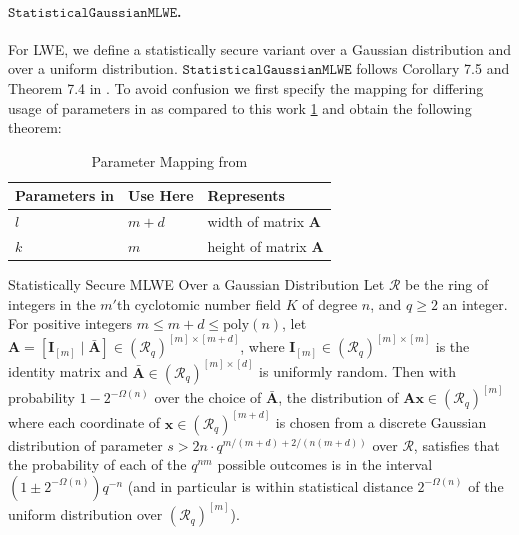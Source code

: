 \documentclass[
  a4paper,  %
  twoside,  %
  bibliography=totoc,
  headsepline,
  cleardoublepage=empty,
  parskip=half,
  draft=false
]{scrbook}
\begin{document}
\paragraph{$\texttt{StatisticalGaussianMLWE}$.} For LWE, we define a statistically secure variant over a Gaussian distribution and over a uniform distribution. $\texttt{StatisticalGaussianMLWE}$ follows Corollary 7.5 and Theorem 7.4 in \cite{LPR13}. To avoid confusion we first specify the mapping for differing usage of parameters in \cite{LPR13} as compared to this work \cref{tab:mapping-LPR13} and obtain the following theorem:

\begin{table}
  \centering
  \begin{tabular}[h]{lll}
    \toprule
    Parameters in \cite{LPR13} & Use Here & Represents                    \\\hline
    $l$                        & $m+d$    & width of matrix $\mathbf{A}$  \\
    $k$                        & $m$      & height of matrix $\mathbf{A}$ \\
    \bottomrule
  \end{tabular}
  \caption{Parameter Mapping from \cite{LPR13}}\label{tab:mapping-LPR13}
\end{table}

\begin{theorem}{Statistically Secure MLWE Over a Gaussian Distribution \cite{LPR13}}
  Let $\mathcal{R}$ be the ring of integers in the $m'$th cyclotomic number field $K$ of degree $n$, and $q \geq 2$ an integer.
  For positive integers $m \leq m + d \leq \text{poly}(n)$, let $\mathbf{A} = [ \mathbf{I}_{[m]} \mid \bar{\mathbf{A}}] \in (\mathcal{R}_q)^{[m] \times [m+d]}$, where $\mathbf{I}_{[m]} \in (\mathcal{R}_q)^{[m] \times [m]}$ is the identity matrix and $\bar{\mathbf{A}} \in (\mathcal{R}_q)^{[m] \times [d]}$ is uniformly random.
  Then with probability $1 - 2^{-\Omega(n)}$ over the choice of $\bar{\mathbf{A}}$, the distribution of $\mathbf{A}\mathbf{x} \in (\mathcal{R}_q)^{[m]}$ where each coordinate of $\mathbf{x} \in (\mathcal{R}_q)^{[m+d]}$ is chosen from a discrete Gaussian distribution of parameter $s > 2n \cdot q^{m / (m+d) + 2/(n (m+d))}$ over $\mathcal{R}$, satisfies that the probability of each of the $q^{n m}$ possible outcomes is in the interval $(1 \pm 2^{-\Omega(n)}) q^{-n }$ (and in particular is within statistical distance $2^{-\Omega(n)}$ of the uniform distribution over $(\mathcal{R}_q)^{[m]}$). %
\end{theorem}
\end{document}
